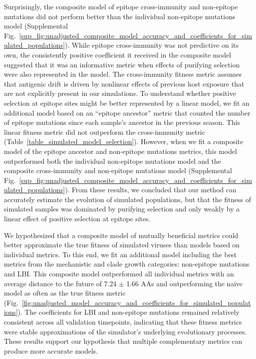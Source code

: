 Surprisingly, the composite model of epitope cross-immunity and non-epitope mutations did not perform better than the individual non-epitope mutations model (Supplemental Fig.~\ref{sup_fig:unadjusted_composite_model_accuracy_and_coefficients_for_simulated_populations}).
While epitope cross-immunity was not predictive on its own, the consistently positive coefficient it received in the composite model suggested that it was an informative metric when effects of purifying selection were also represented in the model.
The cross-immunity fitness metric assumes that antigenic drift is driven by nonlinear effects of previous host exposure \cite{Luksza:2014hj} that are not explicitly present in our simulations.
To understand whether positive selection at epitope sites might be better represented by a linear model, we fit an additional model based on an ``epitope ancestor'' metric that counted the number of epitope mutations since each sample's ancestor in the previous season.
This linear fitness metric did not outperform the cross-immunity metric (Table~\ref{table_simulated_model_selection}).
However, when we fit a composite model of the epitope ancestor and non-epitope mutations metrics, this model outperformed both the individual non-epitope mutations model and the composite cross-immunity and non-epitope mutations model (Supplemental Fig.~\ref{sup_fig:unadjusted_composite_model_accuracy_and_coefficients_for_simulated_populations}).
From these results, we concluded that our method can accurately estimate the evolution of simulated populations, but that the fitness of simulated samples was dominated by purifying selection and only weakly by a linear effect of positive selection at epitope sites.

We hypothesized that a composite model of mutually beneficial metrics could better approximate the true fitness of simulated viruses than models based on individual metrics.
To this end, we fit an additional model including the best metrics from the mechanistic and clade growth categories: non-epitope mutations and LBI.
This composite model outperformed all individual metrics with an average distance to the future of 7.24 $\pm$ 1.66 AAs and outperforming the naive model as often as the true fitness metric (Fig.~\ref{fig:unadjusted_model_accuracy_and_coefficients_for_simulated_populations}).
The coefficients for LBI and non-epitope mutations remained relatively consistent across all validation timepoints, indicating that these fitness metrics were stable approximations of the simulator's underlying evolutionary processes.
These results support our hypothesis that multiple complementary metrics can produce more accurate models.

